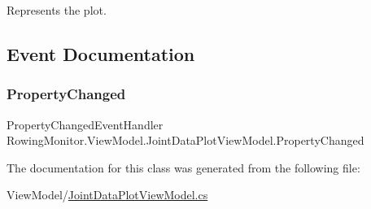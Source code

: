 Represents the plot. 



\subsection{Event Documentation}
\mbox{\label{class_rowing_monitor_1_1_view_model_1_1_joint_data_plot_view_model_ae2148e9e8b2dbb242f0a4cff6265e837}} 
\subsubsection{\texorpdfstring{Property\+Changed}{PropertyChanged}}
{\footnotesize\ttfamily Property\+Changed\+Event\+Handler Rowing\+Monitor.\+View\+Model.\+Joint\+Data\+Plot\+View\+Model.\+Property\+Changed}



The documentation for this class was generated from the following file\+:\begin{DoxyCompactItemize}
\item 
View\+Model/\hyperlink{_joint_data_plot_view_model_8cs}{Joint\+Data\+Plot\+View\+Model.\+cs}\end{DoxyCompactItemize}
